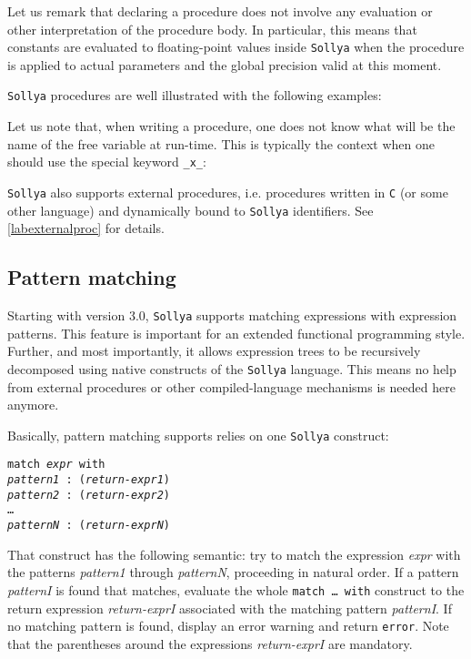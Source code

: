 \documentclass[a4paper]{article}
\newcommand{\key}[1]{\texttt{#1}}
\newcommand{\sollya}{\texttt{Sollya}\xspace}
\begin{document}
Let us remark that declaring a procedure does not involve any evaluation or
other interpretation of the procedure body. In particular, this means
that constants are evaluated to floating-point values inside \sollya
when the procedure is applied to actual parameters and the global
precision valid at this moment.

\sollya procedures are well illustrated with the following examples:









Let us note that, when writing a procedure, one does not know what will
be the name of the free variable at run-time. This is typically the context when one
should use the special keyword \verb|_x_|:



\sollya also supports external procedures, i.e. procedures written in
\texttt{C} (or some other language) and dynamically bound to \sollya
identifiers. See \ref{labexternalproc} for details.

\subsection{Pattern matching}

Starting with version 3.0, \sollya supports matching expressions with
expression patterns. This feature is important for an extended
functional programming style. Further, and most importantly, it allows
expression trees to be recursively decomposed using native constructs
of the \sollya language. This means no help from external procedures
or other compiled-language mechanisms is needed here anymore.

Basically, pattern matching supports relies on one \sollya construct: 
\begin{center}
\begin{minipage}{0.8\textwidth}
\key{match {\it expr} with \\
{\it pattern1} : ({\it return-expr1}) \\
{\it pattern2} : ({\it return-expr2}) \\
\dots \\
{\it patternN} : ({\it return-exprN}) }
\end{minipage}
\end{center} 
That construct has the following semantic: try to match the
expression {\it expr} with the patterns {\it pattern1} through {\it
  patternN}, proceeding in natural order. If a pattern
{\it patternI} is found that matches, evaluate the whole \key{match
  \dots~with} construct to the return expression {\it return-exprI}
associated with the matching pattern {\it patternI}. If no matching
pattern is found, display an error warning and return \key{error}. Note that the parentheses around the expressions {\it return-exprI} are mandatory.
\end{document}

